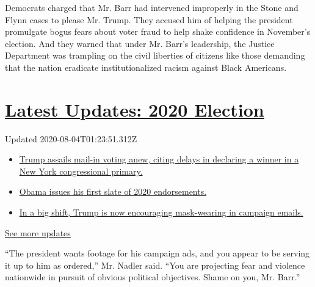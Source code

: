Democrats charged that Mr. Barr had intervened improperly in the Stone
and Flynn cases to please Mr. Trump. They accused him of helping the
president promulgate bogus fears about voter fraud to help shake
confidence in November's election. And they warned that under Mr. Barr's
leadership, the Justice Department was trampling on the civil liberties
of citizens like those demanding that the nation eradicate
institutionalized racism against Black Americans.

\hypertarget{latest-updates-2020-election}{%
\section{\texorpdfstring{\href{https://www.nytimes3xbfgragh.onion/2020/08/03/us/elections/biden-vs-trump.html?action=click\&pgtype=Article\&state=default\&region=MAIN_CONTENT_1\&context=storylines_live_updates}{Latest
Updates: 2020
Election}}{Latest Updates: 2020 Election}}\label{latest-updates-2020-election}}

Updated 2020-08-04T01:23:51.312Z

\begin{itemize}
\tightlist
\item
  \href{https://www.nytimes3xbfgragh.onion/2020/08/03/us/elections/biden-vs-trump.html?action=click\&pgtype=Article\&state=default\&region=MAIN_CONTENT_1\&context=storylines_live_updates\#link-6494b448}{Trump
  assails mail-in voting anew, citing delays in declaring a winner in a
  New York congressional primary.}
\item
  \href{https://www.nytimes3xbfgragh.onion/2020/08/03/us/elections/biden-vs-trump.html?action=click\&pgtype=Article\&state=default\&region=MAIN_CONTENT_1\&context=storylines_live_updates\#link-3de249e6}{Obama
  issues his first slate of 2020 endorsements.}
\item
  \href{https://www.nytimes3xbfgragh.onion/2020/08/03/us/elections/biden-vs-trump.html?action=click\&pgtype=Article\&state=default\&region=MAIN_CONTENT_1\&context=storylines_live_updates\#link-54e34d20}{In
  a big shift, Trump is now encouraging mask-wearing in campaign
  emails.}
\end{itemize}

\href{https://www.nytimes3xbfgragh.onion/2020/08/03/us/elections/biden-vs-trump.html?action=click\&pgtype=Article\&state=default\&region=MAIN_CONTENT_1\&context=storylines_live_updates}{See
more updates}

``The president wants footage for his campaign ads, and you appear to be
serving it up to him as ordered,'' Mr. Nadler said. ``You are projecting
fear and violence nationwide in pursuit of obvious political objectives.
Shame on you, Mr. Barr.''

